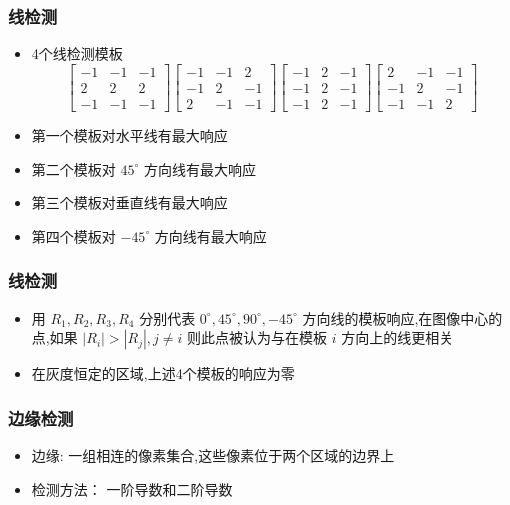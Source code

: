 \documentclass{beamer}
\begin{document}
\begin{frame}
\frametitle{线检测}
\label{sec-2-3}

\begin{itemize}
\item 4个线检测模板
     \[\begin{bmatrix}
         -1 & -1 & -1 \\
          2 &  2 &  2 \\
         -1 & -1 & -1 \end{bmatrix}\begin{bmatrix}
         -1 & -1 &  2 \\
         -1 &  2 & -1 \\
          2 & -1 & -1 \end{bmatrix}\begin{bmatrix}
         -1 &  2 & -1 \\
         -1 &  2 & -1 \\
         -1 &  2 & -1 \end{bmatrix}\begin{bmatrix}
          2 & -1 & -1 \\
         -1 &  2 & -1 \\
         -1 & -1 &  2 \end{bmatrix}\]
\item 第一个模板对水平线有最大响应
\item 第二个模板对 $45^{\circ}$ 方向线有最大响应
\item 第三个模板对垂直线有最大响应
\item 第四个模板对 $-45^{\circ}$ 方向线有最大响应
\end{itemize}
\end{frame}
\begin{frame}
\frametitle{线检测}
\label{sec-2-4}

\begin{itemize}
\item 用 $R_1,R_2,R_3,R_4$ 分别代表 $0^{\circ},45^{\circ},90^{\circ},-45^{\circ}$ 方向线的模板响应,在图像中心的点,如果 $|R_i|>|R_j|,j\neq i$
     则此点被认为与在模板 $i$ 方向上的线更相关
\item 在灰度恒定的区域,上述4个模板的响应为零
\end{itemize}
\end{frame}
\begin{frame}
\frametitle{边缘检测}
\label{sec-2-5}

\begin{itemize}
\item 边缘: 一组相连的像素集合,这些像素位于两个区域的边界上
\item 检测方法： 一阶导数和二阶导数
\end{itemize}
\end{frame}
\end{document}

